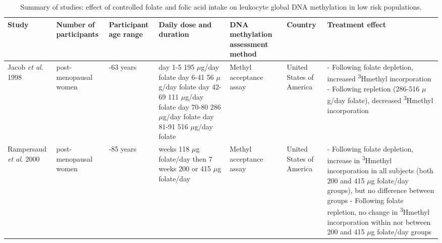 \begin{sidewaystable}
\caption{Summary of studies: effect of controlled folate and folic acid intake on leukocyte global DNA methylation in low risk populations.}
\label{table7_4}
\begin{adjustbox}{width=18cm}
\begin{tabular}{L{2.1cm}C{2cm}C{2.3cm}C{3.5cm}C{2.3cm}C{1.8cm}C{6.1cm}}
\hline\bfseries Study & \bfseries Number of participants & \bfseries Participant age range & \bfseries Daily dose and duration & \bfseries DNA methylation assessment
method & \bfseries Country & \bfseries Treatment effect\\
\hline

\parbox[t][4.1cm]{2.1cm}{\raggedright Jacob {\textit{et al}}{. 1998 \cite{c73}}} &
\parbox[t][4.1cm]{2cm}{ post-menopausal women} &
\parbox[t][4.1cm]{2.3cm}{-63 years} &
\parbox[t][4.1cm]{3.5cm}{\centering day 1-5 195 $\mu$g/day folate { day 6-41 56 $\mu$g/day folate}{ day 42-69 111 $\mu$g/day folate} { day 70-80 286 $\mu$g/day folate} day 81-91 516 $\mu$g/day folate} &
\parbox[t][4.1cm]{2.3cm}{\centering Methyl acceptance assay} &
\parbox[t][4.1cm]{1.8cm}{\centering United States of America} &
\parbox[t][4.1cm]{6.1cm}{\centering - Following folate depletion, increased \textsuperscript{3}Hmethyl incorporation \\ - Following repletion (286-516 $\mu$g/day folate), decreased \textsuperscript{3}Hmethyl incorporation}\\

\parbox[t][4.0cm]{2.1cm}{\raggedright Rampersaud \emph{et al}. 2000 \cite{c74}} &
\parbox[t][4.0cm]{2cm}{ post-menopausal women} &
\parbox[t][4.0cm]{2.3cm}{-85 years} &
\parbox[t][4.0cm]{3.5cm}{ weeks 118 $\mu$g folate/day then 7 weeks 200 or 415 $\mu$g folate/day} &
\parbox[t][4.0cm]{2.3cm}{\centering Methyl acceptance assay} &
\parbox[t][4.0cm]{1.8cm}{\centering United States of America} &
\parbox[t][4.0cm]{6.1cm}{\centering - Following folate depletion, increase in \textsuperscript{3}Hmethyl incorporation in all subjects (both 200 and 415 $\mu$g folate/day groups), but no difference between groups \\ - Following folate repletion, no change in \textsuperscript{3}Hmethyl incorporation within nor between 200 and 415 $\mu$g folate/day groups}\\
\hline
\end{tabular}
\end{adjustbox}
\end{sidewaystable}


